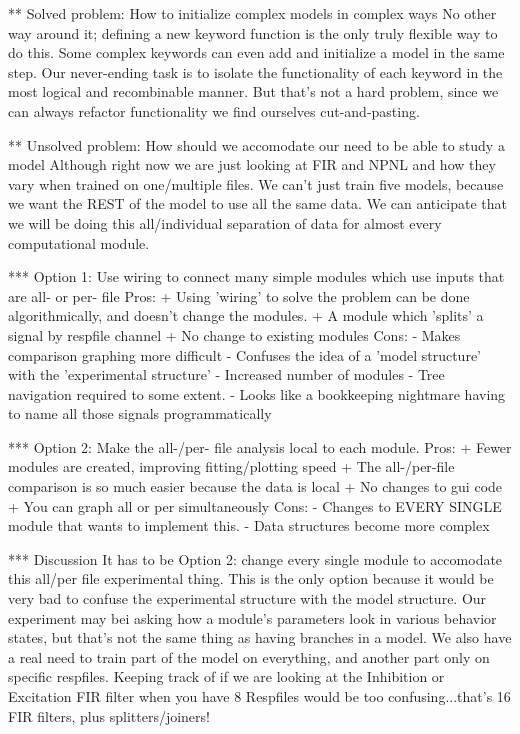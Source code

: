 ** Solved problem: How to initialize complex models in complex ways
   No other way around it; defining a new keyword function is the only truly flexible way to do this. 
   Some complex keywords can even add and initialize a model in the same step.
   Our never-ending task is to isolate the functionality of each keyword in the most logical and recombinable manner.
   But that's not a hard problem, since we can always refactor functionality we find ourselves cut-and-pasting.

** Unsolved problem: How should we accomodate our need to be able to study a model
   Although right now we are just looking at FIR and NPNL and how they vary when trained on one/multiple files.
   We can't just train five models, because we want the REST of the model to use all the same data.
   We can anticipate that we will be doing this all/individual separation of data for almost every computational module.
   
*** Option 1: Use wiring to connect many simple modules which use inputs that are all- or per- file
    Pros: 
    + Using 'wiring' to solve the problem can be done algorithmically, and doesn't change the modules.
    + A module which 'splits' a signal by respfile channel 
    + No change to existing modules
    Cons:
    - Makes comparison graphing more difficult
    - Confuses the idea of a 'model structure' with the 'experimental structure' 
    - Increased number of modules
    - Tree navigation required to some extent.
    - Looks like a bookkeeping nightmare having to name all those signals programmatically

*** Option 2: Make the all-/per- file analysis local to each module.
    Pros:
    + Fewer modules are created, improving fitting/plotting speed
    + The all-/per-file comparison is so much easier because the data is local
    + No changes to gui code
    + You can graph all or per simultaneously
    Cons:
    - Changes to EVERY SINGLE module that wants to implement this.      
    - Data structures become more complex

*** Discussion
    It has to be Option 2: change every single module to accomodate this all/per file experimental thing. 
    This is the only option because it would be very bad to confuse the experimental structure with the model structure. 
    Our experiment may bei asking how a module's parameters look in various behavior states, but that's not the same thing as having branches in a model.
    We also have a real need to train part of the model on everything, and another part only on specific respfiles.
    Keeping track of if we are looking at the Inhibition or Excitation FIR filter when you have 8 Respfiles would be too confusing...that's 16 FIR filters, plus splitters/joiners!

